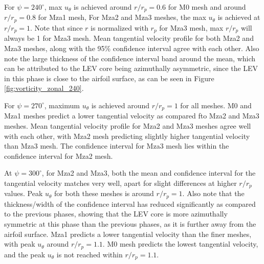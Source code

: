 For $\psi = 240^\circ$, max $u_\theta$ is achieved around $r/r_p= 0.6$ for M0 mesh and around $r/r_p= 0.8$ for Mza1 mesh, 
For Mza2 and Mza3 meshes, the max $u_\theta$ is achieved at $r/r_p = 1$. Note that since $r$ is normalized with $r_p$ for Mza3 mesh, max $r/r_p$ will always be 1 for Mza3 mesh. 
Mean tangential velocity profile for both Mza2 and Mza3 meshes, along with the 95\% confidence interval agree with each other. 
Also note the large thickness of the confidence interval band around the mean, which can be attributed to the LEV core being azimuthally asymmetric, since the LEV in this phase is close to the airfoil surface, as can be seen in Figure \ref{fig:vorticity_zonal_240}.

For $\psi = 270^\circ$, maximum $u_\theta$ is achieved around $r/r_p= 1$ for all meshes. 
M0 and Mza1 meshes predict a lower tangential velocity as compared fto Mza2 and Mza3 meshes. 
Mean tangential velocity profile for Mza2 and Mza3 meshes agree well with each other, with Mza2 mesh predicting slightly higher tangential velocity than Mza3 mesh. 
The confidence interval for Mza3 mesh lies within the confidence interval for Mza2 mesh.

At $\psi = 300^\circ$, for Mza2 and Mza3, both the mean and confidence interval for the tangential velocity matches very well, apart for slight differences at higher $r/r_p$ values. 
Peak $u_\theta$ for both these meshes is around $r/r_p= 1$.
Also note that the thickness/width of the confidence interval has reduced significantly as compared to the previous phases, showing that the LEV core is more azimuthally symmetric at this phase than the previous phases, as it is further away from the airfoil surface.
Mza1 predicts a lower tangential velocity than the finer meshes, with peak $u_\theta$ around $r/r_p= 1.1$. M0 mesh predicts the lowest tangential velocity, and the peak $u_\theta$ is not reached within $r/r_p= 1.1$.

